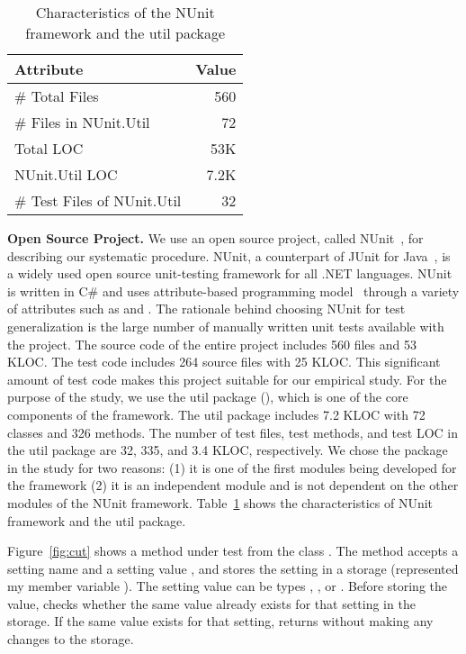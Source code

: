 \setlength{\tabcolsep}{3pt}
\begin{table}[t]
\begin{center}
\centering
\begin{tabular}{|l|r|}
\hline
\textbf{Attribute} & \textbf{Value} \\
\hline
\# Total Files & 560\\
\hline
\# Files in NUnit.Util & 72\\
\hline
Total LOC & 53K\\
\hline
NUnit.Util LOC & 7.2K\\
\hline
\# Test Files of NUnit.Util & 32\\
\hline
\end{tabular}
\end{center}
\caption{Characteristics of the NUnit framework and the util package\label{tab:utilmetrics}}
\end{table}
\textbf{Open Source Project.} We use an open source project, called NUnit~\cite{nunit}, for describing our systematic procedure. NUnit, a counterpart of JUnit for Java~\cite{JUnit}, is a widely used open source unit-testing framework for all .NET languages. NUnit is written in C\# and uses attribute-based programming model~\cite{TDD} through a variety of attributes such as \CodeIn{[TestFixture]} and \CodeIn{[Test]}. The rationale behind choosing NUnit for test generalization is the large number of manually written unit tests available with the project. The source code of the entire project includes 560 files and 53 KLOC. The test code includes 264 source files with 25 KLOC. This significant amount of test code makes this project suitable for our empirical study. For the purpose of the study, we use the util package (), which is one of the core components of the framework. The util package includes 7.2 KLOC with 72 classes and 326 methods. The number of test files, test methods, and test LOC in the util package are 32, 335, and 3.4 KLOC, respectively. We chose the  package in the study for two reasons: (1) it is one of the first modules being developed for the framework (2) it is an independent module and is not dependent on the other modules of the NUnit framework. Table~\ref{tab:utilmetrics} shows the characteristics of NUnit framework and the util package.

Figure~\ref{fig:cut} shows a method under test  from the class . The  method accepts a setting name  and a setting value , and stores the setting in a storage (represented my member variable ). The setting value can be types , ,  or . Before storing the value,  checks whether the same value already exists for that setting in the storage. If the same value exists for that setting,  returns without making any changes to the storage.

